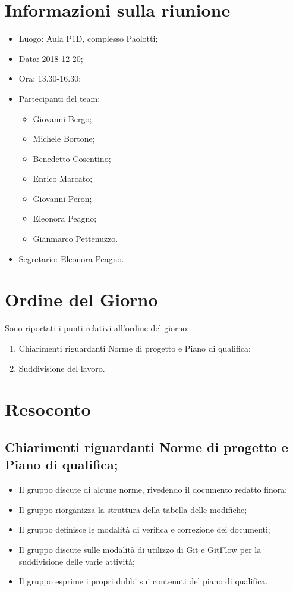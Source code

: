 \documentclass[11pt,a4paper]{article}
\begin{document}
	\section{Informazioni sulla riunione}
	\begin{itemize}
		\item Luogo: Aula P1D, complesso Paolotti;
		\item Data: 2018-12-20;
		\item Ora: 13.30-16.30;
		\item Partecipanti del team:
			\begin{itemize}
				\item Giovanni Bergo;
				\item Michele Bortone;
				\item Benedetto Cosentino;
				\item Enrico Marcato;
				\item Giovanni Peron;
				\item Eleonora Peagno;
				\item Gianmarco Pettenuzzo.
			\end{itemize}
		\item Segretario: Eleonora Peagno.
	\end{itemize}
	
	\section{Ordine del Giorno}
	Sono riportati i punti relativi all'ordine del giorno:
	\begin{enumerate}
		\item Chiarimenti riguardanti Norme di progetto e Piano di qualifica;
		\item Suddivisione del lavoro.
	\end{enumerate}
	
	\section{Resoconto}
	\subsection{Chiarimenti riguardanti Norme di progetto e Piano di qualifica;}
	\begin{itemize}
		\item Il gruppo discute di alcune norme, rivedendo il documento redatto finora;
		\item Il gruppo riorganizza la struttura della tabella delle modifiche;
		\item Il gruppo definisce le modalità di verifica e correzione dei documenti;
		\item Il gruppo discute sulle modalità di utilizzo di Git e GitFlow per la suddivisione delle varie attività;
		\item Il gruppo esprime i propri dubbi sui contenuti del piano di qualifica.
	\end{itemize}
\end{document}
